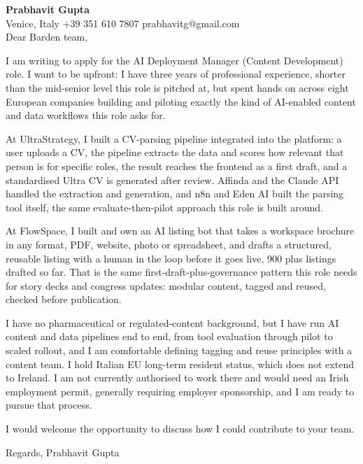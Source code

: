 \documentclass[a4paper,10.5pt]{article}
\begin{document}
\textbf{Prabhavit Gupta}\\
Venice, Italy \textbar{} +39 351 610 7807 \textbar{} prabhavitg@gmail.com\\[10pt]
Dear Barden team,

I am writing to apply for the AI Deployment Manager (Content Development) role. I want to be upfront: I have three years of professional experience, shorter than the mid-senior level this role is pitched at, but spent hands on across eight European companies building and piloting exactly the kind of AI-enabled content and data workflows this role asks for.

At UltraStrategy, I built a CV-parsing pipeline integrated into the platform: a user uploads a CV, the pipeline extracts the data and scores how relevant that person is for specific roles, the result reaches the frontend as a first draft, and a standardised Ultra CV is generated after review. Affinda and the Claude API handled the extraction and generation, and n8n and Eden AI built the parsing tool itself, the same evaluate-then-pilot approach this role is built around.

At FlowSpace, I built and own an AI listing bot that takes a workspace brochure in any format, PDF, website, photo or spreadsheet, and drafts a structured, reusable listing with a human in the loop before it goes live, 900 plus listings drafted so far. That is the same first-draft-plus-governance pattern this role needs for story decks and congress updates: modular content, tagged and reused, checked before publication.

I have no pharmaceutical or regulated-content background, but I have run AI content and data pipelines end to end, from tool evaluation through pilot to scaled rollout, and I am comfortable defining tagging and reuse principles with a content team. I hold Italian EU long-term resident status, which does not extend to Ireland. I am not currently authorised to work there and would need an Irish employment permit, generally requiring employer sponsorship, and I am ready to pursue that process.

I would welcome the opportunity to discuss how I could contribute to your team.

Regards,
Prabhavit Gupta
\end{document}
